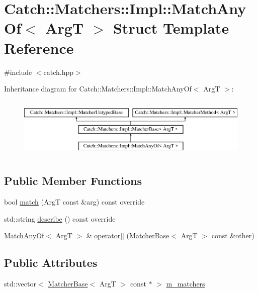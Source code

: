 \hypertarget{structCatch_1_1Matchers_1_1Impl_1_1MatchAnyOf}{}\section{Catch\+:\+:Matchers\+:\+:Impl\+:\+:Match\+Any\+Of$<$ ArgT $>$ Struct Template Reference}
\label{structCatch_1_1Matchers_1_1Impl_1_1MatchAnyOf}


{\ttfamily \#include $<$catch.\+hpp$>$}

Inheritance diagram for Catch\+:\+:Matchers\+:\+:Impl\+:\+:Match\+Any\+Of$<$ ArgT $>$\+:\begin{figure}[H]
\begin{center}
\leavevmode
\includegraphics[height=2.926829cm]{structCatch_1_1Matchers_1_1Impl_1_1MatchAnyOf}
\end{center}
\end{figure}
\subsection*{Public Member Functions}
\begin{DoxyCompactItemize}
\item 
bool \mbox{\hyperlink{structCatch_1_1Matchers_1_1Impl_1_1MatchAnyOf_a8a3e8338f979e56277dcf553efb78dc0}{match}} (ArgT const \&arg) const override
\item 
std\+::string \mbox{\hyperlink{structCatch_1_1Matchers_1_1Impl_1_1MatchAnyOf_a315285204df93d1f8e72f50dd66eb709}{describe}} () const override
\item 
\mbox{\hyperlink{structCatch_1_1Matchers_1_1Impl_1_1MatchAnyOf}{Match\+Any\+Of}}$<$ ArgT $>$ \& \mbox{\hyperlink{structCatch_1_1Matchers_1_1Impl_1_1MatchAnyOf_a44d7582dbe09fc31b9a5ba8a6367b506}{operator$\vert$$\vert$}} (\mbox{\hyperlink{structCatch_1_1Matchers_1_1Impl_1_1MatcherBase}{Matcher\+Base}}$<$ ArgT $>$ const \&other)
\end{DoxyCompactItemize}
\subsection*{Public Attributes}
\begin{DoxyCompactItemize}
\item 
std\+::vector$<$ \mbox{\hyperlink{structCatch_1_1Matchers_1_1Impl_1_1MatcherBase}{Matcher\+Base}}$<$ ArgT $>$ const  $\ast$ $>$ \mbox{\hyperlink{structCatch_1_1Matchers_1_1Impl_1_1MatchAnyOf_a1fb1119e6110dc15b8d5262ec0aeddd5}{m\+\_\+matchers}}
\end{DoxyCompactItemize}
